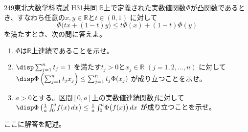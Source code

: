 \begin{prob}{249}{}{東北大数学科院試 H31共同}
 $\mathbb{R}$上で定義された実数値関数$\Phi$が凸関数であるとき、すなわち任意の$x,y\in\mathbb{R}$と$t\in (0,1)$ に対して
 \[ \Phi\bigl(tx+(1-t)y\bigr)\le t\Phi(x)+(1-t)\Phi(y) \]
 を満たすとき、次の問に答えよ。
 \begin{enumerate}
  \item $\Phi$は$\mathbb{R}$上連続であることを示せ。
  \item $\disp \sum_{j=1}^n t_j=1$ を満たす$t_j>0$と$x_j\in\mathbb{R}$ $(j=1,2,\dots, n)$ に対して $\disp \Phi\left(\sum_{j=1}^nt_jx_j\right)\le \sum_{j=1}^nt_j\Phi(x_j)$ が成り立つことを示せ。
  \item $a>0$とする。区間$[0,a]$上の実数値連続関数$f$に対して $\disp \Phi\left(\frac{1}{a}\int_0^a\!f(x)\,dx\right)\le\frac{1}{a}\int_0^a\!\Phi\bigl(f(x)\bigr)\,dx$ が成り立つことを示せ。
 \end{enumerate}
\end{prob}
ここに解答を記述。